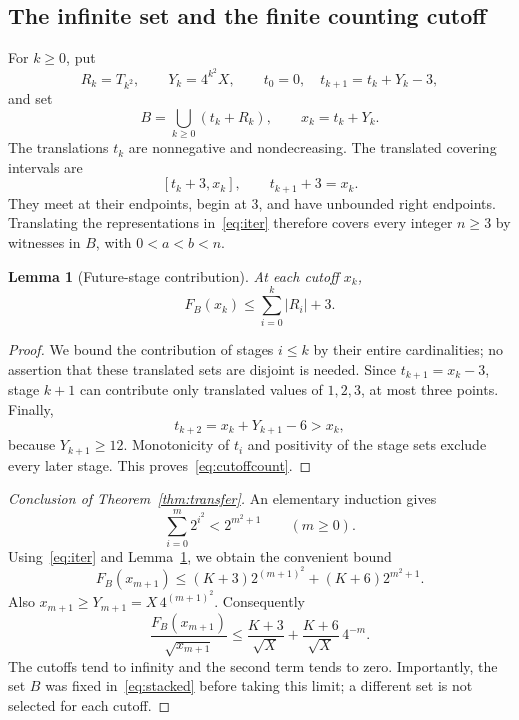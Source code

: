 \documentclass[11pt]{article}
\newtheorem{lemma}[theorem]{Lemma}
\theoremstyle{definition}\newtheorem{definition}[theorem]{Definition}
\theoremstyle{remark}\newtheorem{remark}[theorem]{Remark}
\numberwithin{equation}{section}
\newcommand{\card}[1]{\lvert #1\rvert}
\begin{document}
\subsection{The infinite set and the finite counting cutoff}
For $k\ge0$, put
\begin{equation}\label{eq:stages}
R_k=T_{k^2},\qquad Y_k=4^{k^2}X,\qquad
 t_0=0,\quad t_{k+1}=t_k+Y_k-3,
\end{equation}
and set
\begin{equation}\label{eq:stacked}
B=\bigcup_{k\ge0}(t_k+R_k),\qquad x_k=t_k+Y_k.
\end{equation}
The translations $t_k$ are nonnegative and nondecreasing. The translated covering intervals are
\[
[t_k+3,x_k],\qquad t_{k+1}+3=x_k.
\]
They meet at their endpoints, begin at 3, and have unbounded right endpoints. Translating the representations in~\eqref{eq:iter} therefore covers every integer $n\ge3$ by witnesses in $B$, with $0<a<b<n$.

\begin{lemma}[Future-stage contribution]\label{lem:future}
At each cutoff $x_k$,
\begin{equation}\label{eq:cutoffcount}
F_B(x_k)\le\sum_{i=0}^k\card{R_i}+3.
\end{equation}
\end{lemma}
\begin{proof}
We bound the contribution of stages $i\le k$ by their entire cardinalities; no assertion that these translated sets are disjoint is needed. Since $t_{k+1}=x_k-3$, stage $k+1$ can contribute only translated values of $1,2,3$, at most three points. Finally,
\[
t_{k+2}=x_k+Y_{k+1}-6>x_k,
\]
because $Y_{k+1}\ge12$. Monotonicity of $t_i$ and positivity of the stage sets exclude every later stage. This proves~\eqref{eq:cutoffcount}.
\end{proof}

\begin{proof}[Conclusion of Theorem~\ref{thm:transfer}]
An elementary induction gives
\[
\sum_{i=0}^m2^{i^2}<2^{m^2+1}\qquad(m\ge0).
\]
Using~\eqref{eq:iter} and Lemma~\ref{lem:future}, we obtain the convenient bound
\begin{equation}\label{eq:countbudget}
F_B(x_{m+1})\le (K+3)2^{(m+1)^2}+(K+6)2^{m^2+1}.
\end{equation}
Also $x_{m+1}\ge Y_{m+1}=X\,4^{(m+1)^2}$. Consequently
\begin{equation}\label{eq:expliciterror}
\frac{F_B(x_{m+1})}{\sqrt{x_{m+1}}}
\le\frac{K+3}{\sqrt X}+\frac{K+6}{\sqrt X}\,4^{-m}.
\end{equation}
The cutoffs tend to infinity and the second term tends to zero. Importantly, the set $B$ was fixed in~\eqref{eq:stacked} before taking this limit; a different set is not selected for each cutoff.
\end{proof}
\end{document}
